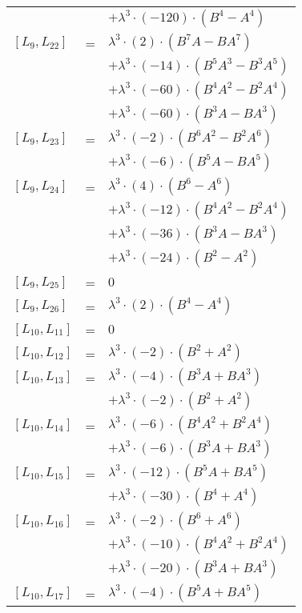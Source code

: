 \documentclass{article}
\begin{document}
\begin{center}
\begin{longtable}{lll}
 & & $ + {\lambda}^3{\cdot}(-120){\cdot}(B^{4}-A^{4})$ \\
$[L_{9},L_{22}]$ & = & ${\lambda}^3{\cdot}(2){\cdot}(B^{7}A-BA^{7})$ \\*
 & & $ + {\lambda}^3{\cdot}(-14){\cdot}(B^{5}A^{3}-B^{3}A^{5})$ \\*
 & & $ + {\lambda}^3{\cdot}(-60){\cdot}(B^{4}A^{2}-B^{2}A^{4})$ \\*
 & & $ + {\lambda}^3{\cdot}(-60){\cdot}(B^{3}A-BA^{3})$ \\
$[L_{9},L_{23}]$ & = & ${\lambda}^3{\cdot}(-2){\cdot}(B^{6}A^{2}-B^{2}A^{6})$ \\*
 & & $ + {\lambda}^3{\cdot}(-6){\cdot}(B^{5}A-BA^{5})$ \\
$[L_{9},L_{24}]$ & = & ${\lambda}^3{\cdot}(4){\cdot}(B^{6}-A^{6})$ \\*
 & & $ + {\lambda}^3{\cdot}(-12){\cdot}(B^{4}A^{2}-B^{2}A^{4})$ \\*
 & & $ + {\lambda}^3{\cdot}(-36){\cdot}(B^{3}A-BA^{3})$ \\*
 & & $ + {\lambda}^3{\cdot}(-24){\cdot}(B^{2}-A^{2})$ \\
$[L_{9},L_{25}]$ & = & $ 0 $ \\
$[L_{9},L_{26}]$ & = & ${\lambda}^3{\cdot}(2){\cdot}(B^{4}-A^{4})$ \\
$[L_{10},L_{11}]$ & = & $ 0 $ \\
$[L_{10},L_{12}]$ & = & ${\lambda}^3{\cdot}(-2){\cdot}(B^{2}+A^{2})$ \\
$[L_{10},L_{13}]$ & = & ${\lambda}^3{\cdot}(-4){\cdot}(B^{3}A+BA^{3})$ \\*
 & & $ + {\lambda}^3{\cdot}(-2){\cdot}(B^{2}+A^{2})$ \\
$[L_{10},L_{14}]$ & = & ${\lambda}^3{\cdot}(-6){\cdot}(B^{4}A^{2}+B^{2}A^{4})$ \\*
 & & $ + {\lambda}^3{\cdot}(-6){\cdot}(B^{3}A+BA^{3})$ \\
$[L_{10},L_{15}]$ & = & ${\lambda}^3{\cdot}(-12){\cdot}(B^{5}A+BA^{5})$ \\*
 & & $ + {\lambda}^3{\cdot}(-30){\cdot}(B^{4}+A^{4})$ \\
$[L_{10},L_{16}]$ & = & ${\lambda}^3{\cdot}(-2){\cdot}(B^{6}+A^{6})$ \\*
 & & $ + {\lambda}^3{\cdot}(-10){\cdot}(B^{4}A^{2}+B^{2}A^{4})$ \\*
 & & $ + {\lambda}^3{\cdot}(-20){\cdot}(B^{3}A+BA^{3})$ \\
$[L_{10},L_{17}]$ & = & ${\lambda}^3{\cdot}(-4){\cdot}(B^{5}A+BA^{5})$ \\*

\end{longtable}
\end{center}
\end{document}
